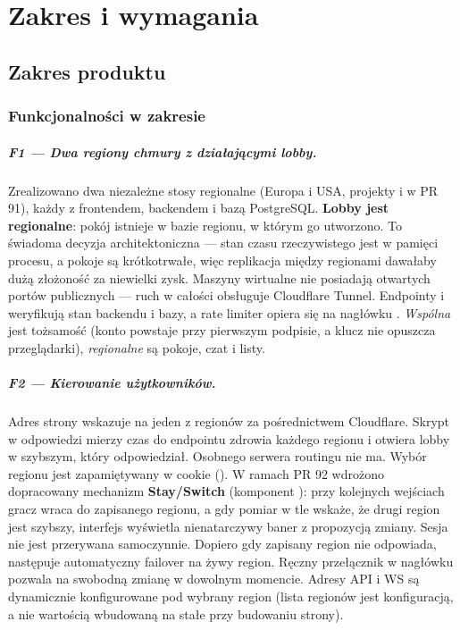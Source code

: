 \chapter{Zakres i wymagania}
\label{ch:wizja-zakres}

\section{Zakres produktu}

\subsection{Funkcjonalności w zakresie}

\paragraph{F1 --- Dwa regiony chmury z działającymi lobby.}
Zrealizowano dwa niezależne stosy regionalne (Europa i USA, projekty
 i  w PR 91), każdy z frontendem, backendem i
bazą PostgreSQL. \textbf{Lobby jest regionalne}: pokój istnieje w bazie regionu, w
którym go utworzono. To świadoma decyzja architektoniczna --- stan czasu
rzeczywistego jest w pamięci procesu, a pokoje są krótkotrwałe, więc
replikacja między regionami dawałaby dużą złożoność za niewielki zysk. Maszyny
wirtualne nie posiadają otwartych portów publicznych --- ruch w całości obsługuje
Cloudflare Tunnel. Endpointy  i  weryfikują stan
backendu i bazy, a rate limiter opiera się na nagłówku .
\emph{Wspólna} jest tożsamość (konto powstaje przy pierwszym podpisie, a klucz nie
opuszcza przeglądarki), \emph{regionalne} są pokoje, czat i listy.

\paragraph{F2 --- Kierowanie użytkowników.}
Adres strony wskazuje na jeden z regionów za pośrednictwem Cloudflare. Skrypt w
odpowiedzi mierzy czas do endpointu zdrowia każdego regionu i otwiera lobby w
szybszym, który odpowiedział. Osobnego serwera routingu nie ma. Wybór regionu jest
zapamiętywany w cookie (). W ramach PR 92 wdrożono dopracowany
mechanizm \textbf{Stay/Switch} (komponent ): przy
kolejnych wejściach gracz wraca do zapisanego regionu, a gdy pomiar w tle wskaże, że
drugi region jest szybszy, interfejs wyświetla nienatarczywy baner z propozycją
zmiany. Sesja nie jest przerywana samoczynnie. Dopiero gdy zapisany region nie
odpowiada, następuje automatyczny failover na żywy region. Ręczny przełącznik w
nagłówku pozwala na swobodną zmianę w dowolnym momencie. Adresy API i WS są
dynamicznie konfigurowane pod wybrany region (lista regionów jest konfiguracją, a nie
wartością wbudowaną na stałe przy budowaniu strony).


